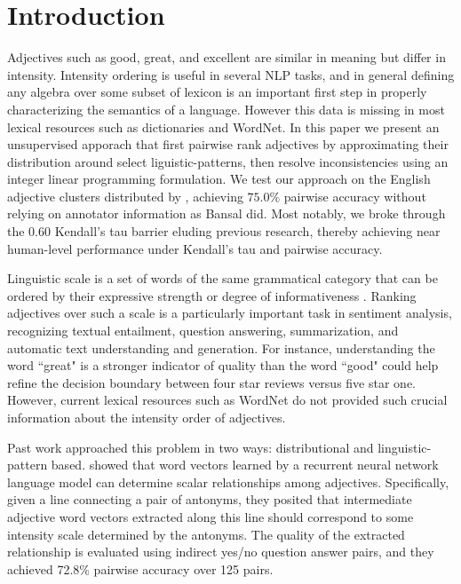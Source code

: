 \section{Introduction}

Adjectives such as good, great, and excellent are similar in meaning but differ in intensity. Intensity ordering is useful in several NLP tasks, and in general defining any algebra over some subset of lexicon is an important first step in properly characterizing the semantics of a language. However this data is missing in most lexical resources such as dictionaries and WordNet. In this paper we present an unsupervised apporach that first pairwise rank adjectives by approximating their distribution around select liguistic-patterns, then resolve inconsistencies using an integer linear programming formulation. We test our approach on the English adjective clusters distributed by , achieving $75.0\%$ pairwise accuracy without relying on annotator information as Bansal did. Most notably, we broke through the $0.60$ Kendall's tau barrier eluding previous research, thereby achieving near human-level performance under Kendall's tau and pairwise accuracy.

Linguistic scale is a set of words of the same grammatical category that can be ordered by their expressive strength or degree of informativeness \cite{sheinman2009adjscales}. Ranking adjectives over such a scale is a particularly important task in sentiment analysis, recognizing textual entailment, question answering, summarization, and automatic text understanding and generation. For instance, understanding the word ``great" is a stronger indicator of quality than the word ``good" could help refine the decision boundary between four star reviews versus five star one. However, current lexical resources such as WordNet do not provided such crucial information about the intensity order of adjectives.

Past work approached this problem in two ways: distributional and linguistic-pattern based.  showed that word vectors learned by a recurrent neural network language model can determine scalar relationships among adjectives. Specifically, given a line connecting a pair of antonyms, they posited that intermediate adjective word vectors extracted along this line should correspond to some intensity scale determined by the antonyms. The quality of the extracted relationship is evaluated using indirect yes/no question answer pairs, and they achieved 72.8\% pairwise accuracy over 125 pairs.

